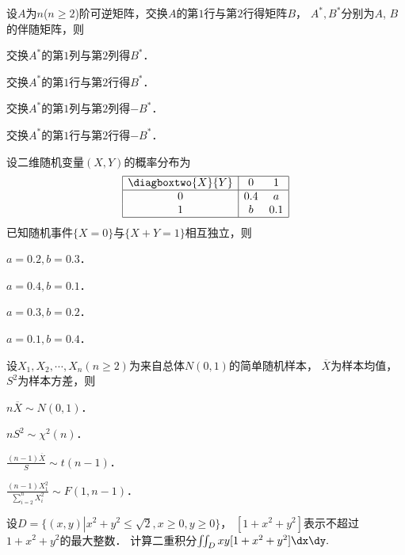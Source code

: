 \documentclass[plain,noanswer,medmath]{../../template/jnuexam}
\begin{document}
\begin{problem}
设$A$为$n$($n \ge 2$)阶可逆矩阵，交换$A$的第$1$行与第$2$行得矩阵$B$，
$A^*,B^*$分别为$A$, $B$的伴随矩阵，则\pickout{}
\begin{abcd}
\item 交换$A^*$的第$1$列与第$2$列得$B^*$．
\item 交换$A^*$的第$1$行与第$2$行得$B^*$．
\item 交换$A^*$的第$1$列与第$2$列得$- B^*$．
\item 交换$A^*$的第$1$行与第$2$行得$- B^*$．
\end{abcd}
\end{problem}


\begin{problem}
设二维随机变量$(X,Y)$的概率分布为
$$\begin{array}{|c|cc|}
\hline
  \diagboxtwo{X}{Y} &   0 & 1 \\
\hline
                  0 & 0.4 & a \\
                  1 &   b & 0.1 \\
\hline
\end{array}$$
已知随机事件$\{X = 0\}$与$\{X + Y = 1\}$相互独立，则\pickout{}
\begin{abcd}
\item $a = 0.2,b = 0.3$．
\item $a = 0.4,b = 0.1$．
\item $a = 0.3,b = 0.2$．
\item $a = 0.1,b = 0.4$．
\end{abcd}
\end{problem}


\begin{problem}
设$X_1,X_2, \cdots ,X_n(n \ge 2)$为来自总体$N(0,1)$的简单随机样本，
$\overline{X}$为样本均值，$S^2$为样本方差，则\pickout{}
\begin{abcd}
\item $n\overline{X}\sim N(0,1)$．
\item $nS^2\sim \chi^2(n)$．
\item $\frac{(n - 1)\overline{X}}{S}\sim t(n - 1)$．
\item $\frac{(n - 1)X_1^2}{\sum_{i = 2}^n X_i^2}\sim F(1,n - 1)$．
\end{abcd}
\end{problem}




\begin{problem}[points=11]
设$D = \{(x,y)\left| x^2 + y^2 \le \sqrt{2} ,x \ge 0,y \ge 0 \right.\}$，
$[1 + x^2 + y^2]$表示不超过$1 + x^2 + y^2$的最大整数．
计算二重积分$\iint_D xy[1 + x^2 + y^2]\dx\dy.$
\end{problem}
\end{document}
